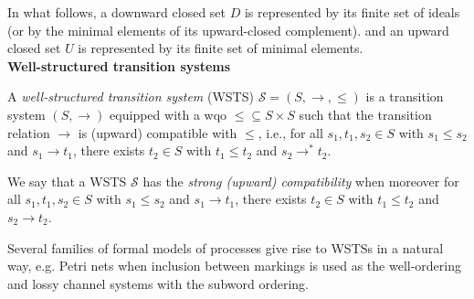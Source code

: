 In what follows, a downward closed set $D$ is represented by its finite set of ideals (or by the minimal elements of its upward-closed complement).
and an upward closed set $U$ is represented by its finite set of minimal elements. \\



\noindent
{\bf Well-structured transition systems}


\begin{definition}\cite{DBLP:journals/iandc/Finkel90,DBLP:journals/tcs/FinkelS01}
A {\em well-structured transition system} (WSTS)  $\mathscr{S}=(S, \rightarrow, \leq)$
is a transition system $(S, \rightarrow)$
equipped with a wqo ${\leq} \subseteq S \times S$ such that  
the transition relation $ \rightarrow$ is (upward) compatible with $\leq$, i.e., for all 
$s_1, t_1 , s_2 \in S$
	with $s_1 \leq s_2$  and $s_1 \rightarrow t_1$, there exists 
	$t_2 \in S$ with 
	$t_1 \leq t_2$ and $s_2 \rightarrow^{*} t_2$.
\end{definition}

We say that a WSTS $\mathscr{S}$ has the \emph{strong (upward) compatibility} when moreover for all 
$s_1, t_1 , s_2 \in S$
	with $s_1 \leq s_2$  and $s_1 \rightarrow t_1$, there exists 
	$t_2 \in S$ with 
	$t_1 \leq t_2$ and $s_2 \rightarrow t_2$.

Several families of formal models of processes give rise to WSTSs in a natural way, e.g. Petri nets when inclusion between markings is used as the well-ordering and lossy channel systems with the subword ordering.


\iffalse
\begin{proposition}\cite{DBLP:journals/tcs/FinkelS01}
If $\mathscr{S}$ is an WSTS and $U \subseteq S$ is an upward-closed set of states, then $\pred^*(U )$ is upward-
closed.
\end{proposition}
%
Proof. Assume $s \in \pred^* (U )$. Then $s \rightarrow^* t$ for some $t \in U $. If now $s' \geq s$ then upward-compatibility entails that $s' \rightarrow^* t'$ for some $t' \geq t$. Then $t' \in U$ and $s' \in \pred^*(U )$.
\fi



